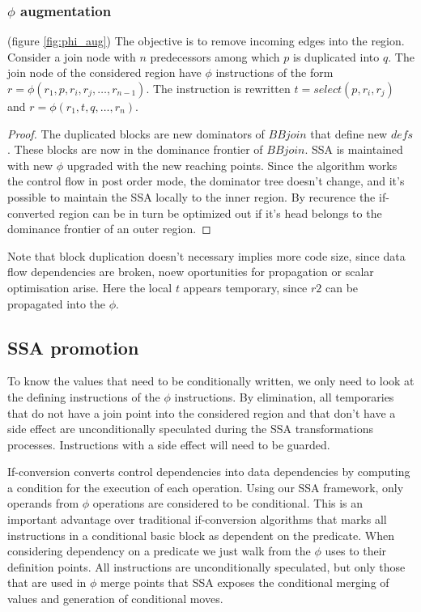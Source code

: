 \subsubsection{$\phi$ augmentation} (figure \ref{fig:phi_aug})
The objective is to remove incoming edges into the region. 
Consider a join node with $n$ predecessors among which $p$ is duplicated into $q$.  The join node of the considered region have $\phi$ instructions of the form $r=\phi(r_1,p,r_i,r_j,\dots,r_{n-1})$. The instruction is rewritten $t=select(p,r_i,r_j)$ and \mbox{$r=\phi(r_1,t,q,\dots,r_n)$}. 
\begin{proof}The duplicated blocks are new dominators of $BBjoin$ that define new $defs$. These blocks are now in the dominance frontier of $BBjoin$. SSA is maintained with new $\phi$ upgraded with the new reaching points.
Since the algorithm works the control flow in post order mode, the dominator tree doesn't change, and it's possible to maintain the SSA locally to the inner region. By recurence the if-converted region can be in turn be optimized out if it's head belongs to the dominance frontier of an outer region.
\end{proof}
Note that block duplication doesn't necessary implies more code size, since data flow dependencies are broken, noew oportunities for propagation or scalar optimisation arise. Here the local $t$ appears temporary, since $r2$ can be propagated into the $\phi$.

\subsection{SSA promotion}

To know the values that need to be conditionally written, we only need to look at the defining instructions of the $\phi$ instructions. By elimination, all temporaries that do not have a join point into the considered region and that don't have a side effect are unconditionally speculated during the SSA transformations processes. Instructions with a side effect will need to be guarded.

If-conversion converts control dependencies into data dependencies by computing a condition for the execution of each operation. Using our SSA framework, only operands from $\phi$ operations are considered to be conditional. This is an important advantage over traditional if-conversion algorithms that marks all instructions in a conditional basic block as dependent on the predicate. When considering dependency on a predicate we just walk from the $\phi$ uses to their definition points. All instructions are unconditionally speculated, but only those that are used in $\phi$ merge points that SSA exposes the conditional merging of values and generation of conditional moves.

